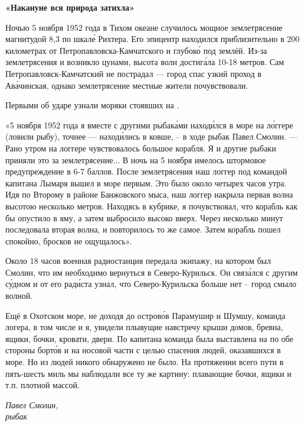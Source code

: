 \textbf{«Накануне вся природа затихла»}

Ночью 5 ноября 1952 года в Тихом океане случилось мощное землетрясение магнитудой 8,3 по шкал\'{е} Рихтера. Его эпицентр находился приблизительно в 200 километрах от Петропавловска-Камчатского и глубок\'{о} под землёй. Из-за землетрясения и возникло цунами, высота волн достиг\'{а}ла 10-18 метров. Сам Петропавловск-Камчатский не пострадал --- город спас узкий проход в  Ав\'{а}чинская, однако землетрясение местные жители почувствовали.

Первыми об ударе узнали моряки стоявших на  .

«5 ноября 1952 года я вместе с другими рыбак\'{а}ми наход\'{и}лся в море на л\'{о}ггере (ловили рыбу), точнее --- наход\'{и}лись в ковше, --  в ходе  рыбак Павел Смолин. --- Рано утром на логгере чувствовалось большое  корабля. Я и другие рыбаки приняли это за землетрясение... В ночь на 5 ноября имелось штормовое предупреждение в 6-7 баллов. После землетрясения наш логгер под командой капитана Лымаря вышел в море первым. Это было около четырех часов утра. Идя по Второму  в районе Банжовского мыса, наш логгер накрыла первая волна высотою несколько метров. Находясь в кубрике, я почувствовал, что корабль как бы опустило в яму, а затем выбросило высоко вверх. Через несколько минут последовала вторая волна, и повторилось то же самое. Затем корабль пошел спокойно, бросков не ощущалось».

Около 18 часов военная радиостанция передала экипажу, на котором был Смолин, что им необходимо вернуться в Северо-Курильск. Он связ\'{а}лся с другим с\'{у}дном и от его рад\'{и}ста узнал, что Северо-Курильска больше нет -- город смыло волной.

\begin{fancyquotes}
    Ещё в Охотском море, не доходя до остров\'{о}в Парамушир и Шумшу, команда логера, в том числе и я, увидели плывущие навстречу крыши домов, бревна, ящики, бочки, кровати, двери. По  капитана команда была выставлена на  по обе стороны борт\'{о}в и на носовой части с целью спасения людей, оказавшихся в море. Но из людей никого обнаружено не было. На протяжении всего пути в пять-шесть миль мы наблюдали все ту же картину: плавающие бочки, ящики и т.п. плотной массой.\\

    \begin{flushright}
        \it
        Павел Смолин,
        \\
        рыбак
    \end{flushright}
\end{fancyquotes}

